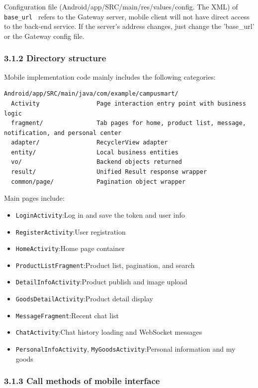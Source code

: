 \documentclass{article}
\begin{document}
Configuration file (Android/app/SRC/main/res/values/config. The XML) of \texttt{ base\_url } refers to the Gateway server, mobile client will not have direct access to the back-end service. If the server's address changes, just change the 'base\_url' or the Gateway config file.

\subsubsection{3.1.2 Directory structure}

Mobile implementation code mainly includes the following categories:

\begin{verbatim}
Android/app/SRC/main/java/com/example/campusmart/
  Activity                Page interaction entry point with business logic
  fragment/               Tab pages for home, product list, message, notification, and personal center
  adapter/                RecyclerView adapter
  entity/                 Local business entities
  vo/                     Backend objects returned
  result/                 Unified Result response wrapper
  common/page/            Pagination object wrapper
\end{verbatim}

Main pages include:

\begin{itemize}
    \item \texttt{LoginActivity}:Log in and save the token and user info
    \item \texttt{RegisterActivity}:User registration
    \item \texttt{HomeActivity}:Home page container
    \item \texttt{ProductListFragment}:Product list, pagination, and search
    \item \texttt{DetailInfoActivity}:Product publish and image upload
    \item \texttt{GoodsDetailActivity}:Product detail display
    \item \texttt{MessageFragment}:Recent chat list
    \item \texttt{ChatActivity}:Chat history loading and WebSocket messages
    \item \texttt{PersonalInfoActivity}, \texttt{MyGoodsActivity}:Personal information and my goods
\end{itemize}

\subsubsection{3.1.3 Call methods of mobile interface}
\end{document}
